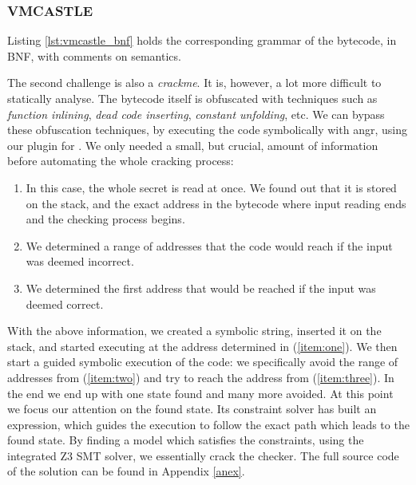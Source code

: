 \subsubsection{VMCASTLE}

Listing \ref{lst:vmcastle_bnf} holds the corresponding grammar of the  bytecode, in \gls{BNF}, with comments on semantics.

The second challenge is also a \emph{crackme}. It is, however, a lot more difficult to statically analyse. The bytecode itself is obfuscated with techniques such as \emph{function inlining}, \emph{dead code inserting}, \emph{constant unfolding}, etc. We can bypass these obfuscation techniques, by executing the code symbolically with angr, using our plugin for . We only needed a small, but crucial, amount of information before automating the whole cracking process:

\begin{enumerate}
    \item In this case, the whole secret is read at once. We found out that it is stored on the stack, and the exact address in the bytecode where input reading ends and the checking process begins. \label{item:one}
    \item We determined a range of addresses that the code would reach if the input was deemed incorrect. \label{item:two}
    \item We determined the first address that would be reached if the input was deemed correct. \label{item:three}
\end{enumerate}

With the above information, we created a symbolic string, inserted it on the stack, and started executing at the address determined in (\ref{item:one}). We then start a guided symbolic execution of the code: we specifically avoid the range of addresses from (\ref{item:two}) and try to reach the address from (\ref{item:three}). In the end we end up with one state found and many more avoided. At this point we focus our attention on the found state. Its constraint solver has built an expression, which guides the execution to follow the exact path which leads to the found state. By finding a model which satisfies the constraints, using the integrated Z3 \cite{z3} \gls{SMT} solver, we essentially crack the checker. The full source code of the solution can be found in Appendix \ref{anex}.

